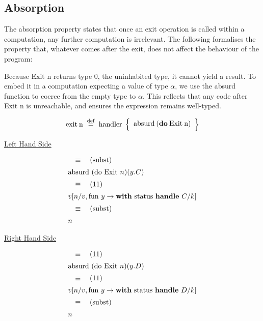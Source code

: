 \documentclass[logo,bsc,singlespacing,parskip]{infthesis}
\begin{document}
\subsection*{Absorption}

The absorption property states that once an exit operation is called within a computation, any further computation is irrelevant. The following formalises the property that, whatever comes after the exit, does not affect the behaviour of the program:


Because Exit n returns type 0, the uninhabited type, it cannot yield a result. To embed it in a computation expecting a value of type $\alpha$, we use the absurd function to coerce from the empty type to $\alpha$. This reflects that any code after Exit n is unreachable, and ensures the expression remains well-typed.

\[
\mathrm{exit\:n} \;\overset{\mathrm{def}}{=}\;
\mathrm{handler} \;\left\{
\begin{array}{l}
  \text{absurd\:(\textbf{do}\:Exit\:n)} \quad\\[0.5ex]

\end{array}
\right\}
\]

\underline{Left Hand Side}

\[
\begin{array}{l}
\quad\equiv\quad (\text{subst}) \\[5pt]
\text{absurd (do Exit } n) (y. C) \\[5pt]
\quad\equiv\quad (11) \\[5pt]
v [n/v, \text{fun } y \rightarrow \text{\textbf{with} status \textbf{handle} } C/k] \\[5pt]
\quad\equiv\quad (\text{subst}) \\[5pt]
n
\end{array}
\]

\underline{Right Hand Side}

\[
\begin{array}{l}
\quad\equiv\quad (11) \\[5pt]
\text{absurd (do Exit } n) (y. D) \\[5pt]
\quad\equiv\quad (11) \\[5pt]
v [n/v, \text{fun } y \rightarrow \text{\textbf{with} status \textbf{handle} } D/k] \\[5pt]
\quad\equiv\quad (\text{subst}) \\[5pt]
n
\end{array}
\]
\end{document}
